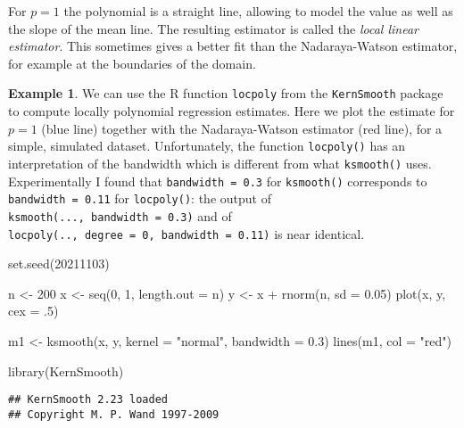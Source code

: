 \documentclass[
  a4paper,
]{article}
\newenvironment{Shaded}{\begin{snugshade}}{\end{snugshade}}
\newcommand{\AttributeTok}[1]{\textcolor[rgb]{0.77,0.63,0.00}{#1}}
\newcommand{\DecValTok}[1]{\textcolor[rgb]{0.00,0.00,0.81}{#1}}
\newcommand{\FloatTok}[1]{\textcolor[rgb]{0.00,0.00,0.81}{#1}}
\newcommand{\FunctionTok}[1]{\textcolor[rgb]{0.00,0.00,0.00}{#1}}
\newcommand{\NormalTok}[1]{#1}
\newcommand{\OtherTok}[1]{\textcolor[rgb]{0.56,0.35,0.01}{#1}}
\newcommand{\SpecialCharTok}[1]{\textcolor[rgb]{0.00,0.00,0.00}{#1}}
\newcommand{\StringTok}[1]{\textcolor[rgb]{0.31,0.60,0.02}{#1}}
\theoremstyle{definition}
\theoremstyle{definition}
\newtheorem{example}{Example}[section]
\theoremstyle{definition}
\theoremstyle{definition}
\theoremstyle{remark}
\begin{document}
For \(p=1\) the polynomial is a straight line, allowing to model the
value as well as the slope of the mean line. The resulting estimator
is called the \emph{local linear estimator}.
This sometimes gives
a better fit than the Nadaraya-Watson estimator, for example at the boundaries
of the domain.

\begin{example}
We can use the R function \texttt{locpoly} from the \texttt{KernSmooth} package to
compute locally polynomial regression estimates. Here we plot
the estimate for \(p=1\) (blue line) together with the Nadaraya-Watson
estimator (red line), for a simple, simulated dataset.
Unfortunately, the function \texttt{locpoly()} has an interpretation of the bandwidth
which is different from what \texttt{ksmooth()} uses. Experimentally I found
that \texttt{bandwidth\ =\ 0.3} for \texttt{ksmooth()} corresponds to
\texttt{bandwidth\ =\ 0.11} for \texttt{locpoly()}: the output of
\texttt{ksmooth(...,\ bandwidth\ =\ 0.3)}
and of \texttt{locpoly(..,\ degree\ =\ 0,\ bandwidth\ =\ 0.11)} is near identical.

\begin{Shaded}
\begin{Highlighting}[]
\FunctionTok{set.seed}\NormalTok{(}\DecValTok{20211103}\NormalTok{)}

\NormalTok{n }\OtherTok{\textless{}{-}} \DecValTok{200}
\NormalTok{x }\OtherTok{\textless{}{-}} \FunctionTok{seq}\NormalTok{(}\DecValTok{0}\NormalTok{, }\DecValTok{1}\NormalTok{, }\AttributeTok{length.out =}\NormalTok{ n)}
\NormalTok{y }\OtherTok{\textless{}{-}}\NormalTok{ x }\SpecialCharTok{+} \FunctionTok{rnorm}\NormalTok{(n, }\AttributeTok{sd =} \FloatTok{0.05}\NormalTok{)}
\FunctionTok{plot}\NormalTok{(x, y, }\AttributeTok{cex =}\NormalTok{ .}\DecValTok{5}\NormalTok{)}

\NormalTok{m1 }\OtherTok{\textless{}{-}} \FunctionTok{ksmooth}\NormalTok{(x, y, }\AttributeTok{kernel =} \StringTok{"normal"}\NormalTok{, }\AttributeTok{bandwidth =} \FloatTok{0.3}\NormalTok{)}
\FunctionTok{lines}\NormalTok{(m1, }\AttributeTok{col =} \StringTok{"red"}\NormalTok{)}

\FunctionTok{library}\NormalTok{(KernSmooth)}
\end{Highlighting}
\end{Shaded}

\begin{verbatim}
## KernSmooth 2.23 loaded
## Copyright M. P. Wand 1997-2009
\end{verbatim}


\end{example}
\end{document}
